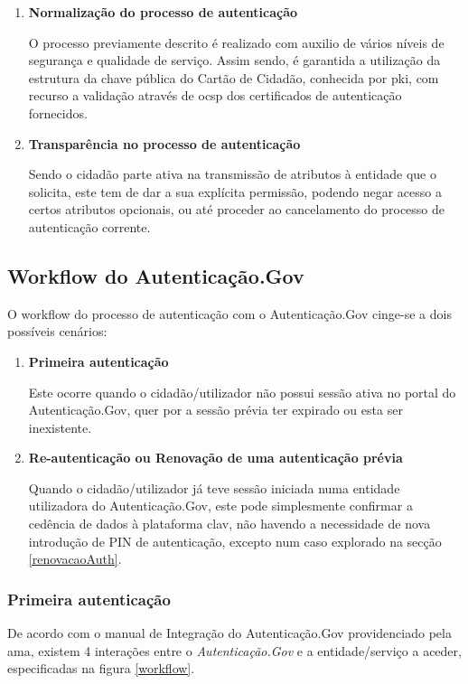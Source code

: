 \begin{enumerate}
    \item \textbf{Normalização do processo de autenticação}
    
    O processo previamente descrito é realizado com auxilio de vários níveis de segurança e qualidade de serviço. Assim sendo, é garantida a utilização da estrutura da chave pública do Cartão de Cidadão, conhecida por \gls{pki}, com recurso a validação através de \gls{ocsp} dos certificados de autenticação fornecidos.
    
    \item \textbf{Transparência no processo de autenticação}
    
    Sendo o cidadão parte ativa na transmissão de atributos à entidade que o solicita, este tem de dar a sua explícita permissão, podendo negar acesso a certos atributos opcionais, ou até proceder ao cancelamento do processo de autenticação corrente.
\end{enumerate}

\cleardoublepage
\subsection{Workflow do Autenticação.Gov}

O workflow do processo de autenticação com o Autenticação.Gov cinge-se a dois possíveis cenários:

\begin{enumerate}
    \item \textbf{Primeira autenticação}
    
    Este ocorre quando o cidadão/utilizador não possui sessão ativa no portal do Autenticação.Gov, quer por a sessão prévia ter expirado ou esta ser inexistente.
    
    \item \textbf{Re-autenticação ou Renovação de uma autenticação prévia}
    
    Quando o cidadão/utilizador já teve sessão iniciada numa entidade utilizadora do Autenticação.Gov, este pode simplesmente confirmar a cedência de dados à plataforma \gls{clav}, não havendo a necessidade de nova introdução de PIN de autenticação, excepto num caso explorado na secção \ref{renovacaoAuth}.
\end{enumerate}

\subsubsection{Primeira autenticação}
De acordo com o manual de Integração do Autenticação.Gov\cite{manualAuthGov} providenciado pela \gls{ama}, existem 4 interações entre o \emph{Autenticação.Gov} e a entidade/serviço a aceder, especificadas na figura \ref{workflow}.

